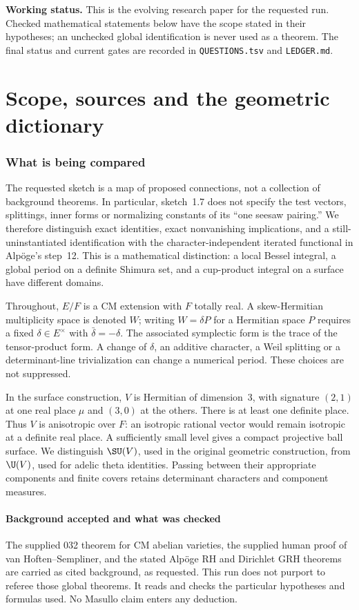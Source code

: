 \documentclass[11pt]{article}
\theoremstyle{definition}\newtheorem{definition}[theorem]{Definition}\newtheorem{remark}[theorem]{Remark}
\begin{document}
\noindent\textbf{Working status.} This is the evolving research paper for the requested run. Checked mathematical statements below have the scope stated in their hypotheses; an unchecked global identification is never used as a theorem. The final status and current gates are recorded in \texttt{QUESTIONS.tsv} and \texttt{LEDGER.md}.

\tableofcontents\clearpage
\part{Scope, sources and the geometric dictionary}
\section{What is being compared}
The requested sketch is a map of proposed connections, not a collection of background theorems. In particular, sketch~1.7 does not specify the test vectors, splittings, inner forms or normalizing constants of its ``one seesaw pairing.'' We therefore distinguish exact identities, exact nonvanishing implications, and a still-uninstantiated identification with the character-independent iterated functional in Alp\"oge's step~12. This is a mathematical distinction: a local Bessel integral, a global period on a definite Shimura set, and a cup-product integral on a surface have different domains.

Throughout, $E/F$ is a CM extension with $F$ totally real. A skew-Hermitian multiplicity space is denoted $W$; writing $W=\delta P$ for a Hermitian space $P$ requires a fixed $\delta\in E^\times$ with $\bar\delta=-\delta$. The associated symplectic form is the trace of the tensor-product form. A change of $\delta$, an additive character, a Weil splitting or a determinant-line trivialization can change a numerical period. These choices are not suppressed.

In the surface construction, $V$ is Hermitian of dimension~3, with signature $(2,1)$ at one real place $\mu$ and $(3,0)$ at the others. There is at least one definite place. Thus $V$ is anisotropic over $F$: an isotropic rational vector would remain isotropic at a definite real place. A sufficiently small level gives a compact projective ball surface. We distinguish $\SU(V)$, used in the original geometric construction, from $\U(V)$, used for adelic theta identities. Passing between their appropriate components and finite covers retains determinant characters and component measures.

\subsection{Background accepted and what was checked}
The supplied 032 theorem for CM abelian varieties, the supplied human proof of van Hoften--Sempliner, and the stated Alp\"oge RH and Dirichlet GRH theorems are carried as cited background, as requested. This run does not purport to referee those global theorems. It reads and checks the particular hypotheses and formulas used. No Masullo claim enters any deduction.
\end{document}
